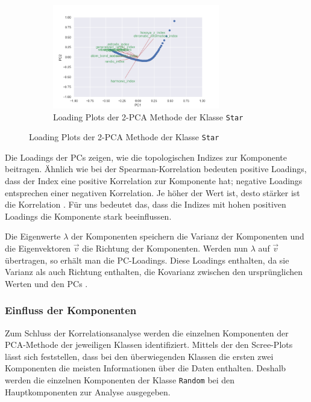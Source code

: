 \begin{figure}[H]
    \ContinuedFloat
    \centering
    \begin{subfigure}{0.8\textwidth}
        \centering
        \includegraphics[width=0.8\textwidth]{images/30_results/star-pca-loadings.png}
        \caption{Loading Plots der 2-PCA Methode der Klasse \texttt{Star}}
        \label{fig:pca-loading-star}
    \end{subfigure}%
\end{figure}

Die Loadings der PCs zeigen, wie die topologischen Indizes zur Komponente beitragen.
Ähnlich wie bei der Spearman-Korrelation bedeuten positive Loadings, dass der Index eine positive Korrelation zur Komponente hat; negative Loadings entsprechen einer negativen Korrelation. Je höher der Wert ist, desto stärker ist die Korrelation \cite{bartl_statistik_2017}. Für uns bedeutet das, dass die Indizes mit hohen positiven Loadings die Komponente stark beeinflussen.

Die Eigenwerte $ \lambda $ der Komponenten speichern die Varianz der Komponenten und die Eigenvektoren $ \vec{v} $ die Richtung der Komponenten. Werden nun $ \lambda $ auf $ \vec{v} $ übertragen, so erhält man die PC-Loadings. Diese Loadings enthalten, da sie Varianz als auch Richtung enthalten, die Kovarianz zwischen den ursprünglichen Werten und den PCs \cite[p.~438]{abdi_principal_2010}.

\newpage

\subsubsection{Einfluss der Komponenten}

Zum Schluss der Korrelationsanalyse werden die einzelnen Komponenten der PCA-Methode der jeweiligen Klassen identifiziert.
Mittels der den Scree-Plots lässt sich feststellen, dass bei den überwiegenden Klassen die ersten zwei Komponenten die meisten Informationen über die Daten enthalten.
Deshalb werden die einzelnen Komponenten der Klasse \texttt{Random} bei den Hauptkomponenten zur Analyse ausgegeben.

